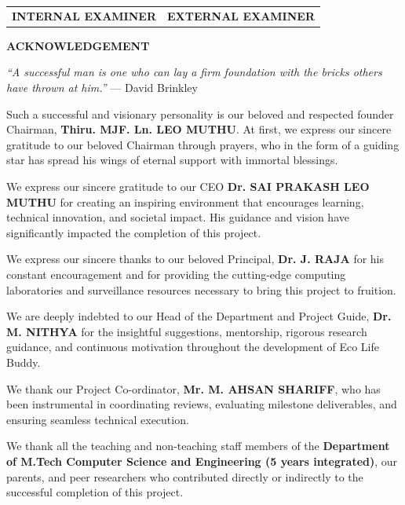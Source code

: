 \documentclass[12pt,a4paper]{report}
\begin{document}
\vspace{1.5cm}
\noindent
\begin{tabular}{p{7.5cm}p{7.5cm}}
\textbf{INTERNAL EXAMINER} & \raggedleft\textbf{EXTERNAL EXAMINER} \tabularnewline
\end{tabular}

\newpage
\begin{center}
{\Large \textbf{ACKNOWLEDGEMENT}}\par
\end{center}
\vspace{0.5cm}

\textit{``A successful man is one who can lay a firm foundation with the bricks others have thrown at him.''} --- David Brinkley

\vspace{0.4cm}
Such a successful and visionary personality is our beloved and respected founder Chairman, \textbf{Thiru. MJF. Ln. LEO MUTHU}. At first, we express our sincere gratitude to our beloved Chairman through prayers, who in the form of a guiding star has spread his wings of eternal support with immortal blessings.

We express our sincere gratitude to our CEO \textbf{Dr. SAI PRAKASH LEO MUTHU} for creating an inspiring environment that encourages learning, technical innovation, and societal impact. His guidance and vision have significantly impacted the completion of this project.

We express our sincere thanks to our beloved Principal, \textbf{Dr. J. RAJA} for his constant encouragement and for providing the cutting-edge computing laboratories and surveillance resources necessary to bring this project to fruition.

We are deeply indebted to our Head of the Department and Project Guide, \textbf{Dr. M. NITHYA} for the insightful suggestions, mentorship, rigorous research guidance, and continuous motivation throughout the development of Eco Life Buddy.

We thank our Project Co-ordinator, \textbf{Mr. M. AHSAN SHARIFF}, who has been instrumental in coordinating reviews, evaluating milestone deliverables, and ensuring seamless technical execution.

We thank all the teaching and non-teaching staff members of the \textbf{Department of M.Tech Computer Science and Engineering (5 years integrated)}, our parents, and peer researchers who contributed directly or indirectly to the successful completion of this project.
\end{document}

